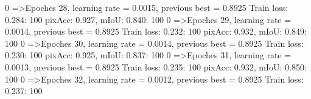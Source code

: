   0%
=>Epoches 28, learning rate = 0.0015,                 previous best = 0.8925
Train loss: 0.284: 100%
pixAcc: 0.927, mIoU: 0.840: 100%
  0%
=>Epoches 29, learning rate = 0.0014,                 previous best = 0.8925
Train loss: 0.232: 100%
pixAcc: 0.932, mIoU: 0.849: 100%
  0%
=>Epoches 30, learning rate = 0.0014,                 previous best = 0.8925
Train loss: 0.230: 100%
pixAcc: 0.925, mIoU: 0.837: 100%
  0%
=>Epoches 31, learning rate = 0.0013,                 previous best = 0.8925
Train loss: 0.235: 100%
pixAcc: 0.932, mIoU: 0.850: 100%
  0%
=>Epoches 32, learning rate = 0.0012,                 previous best = 0.8925
Train loss: 0.237: 100%
